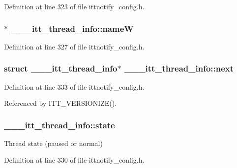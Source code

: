 Definition at line 323 of file ittnotify\-\_\-config.\-h.

\hypertarget{struct______itt__thread__info_a607067bccd38bfb17c9f7c8676caf03d}{
\subsubsection[{name\-W}]{$\ast$ \-\_\-\-\_\-\-\_\-itt\-\_\-thread\-\_\-info\-::name\-W}}\label{struct______itt__thread__info_a607067bccd38bfb17c9f7c8676caf03d}


Definition at line 327 of file ittnotify\-\_\-config.\-h.

\hypertarget{struct______itt__thread__info_a1c1665afb537536190a66931a94ccae8}{
\subsubsection[{next}]{\setlength{\rightskip}{0pt plus 5cm}struct {\bf \-\_\-\-\_\-\-\_\-itt\-\_\-thread\-\_\-info}$\ast$ \-\_\-\-\_\-\-\_\-itt\-\_\-thread\-\_\-info\-::next}}\label{struct______itt__thread__info_a1c1665afb537536190a66931a94ccae8}


Definition at line 333 of file ittnotify\-\_\-config.\-h.



Referenced by I\-T\-T\-\_\-\-V\-E\-R\-S\-I\-O\-N\-I\-Z\-E().

\hypertarget{struct______itt__thread__info_a6f6f3ed5a462461cc8dc05b650e331ba}{
\subsubsection[{state}]{ \-\_\-\-\_\-\-\_\-itt\-\_\-thread\-\_\-info\-::state}}\label{struct______itt__thread__info_a6f6f3ed5a462461cc8dc05b650e331ba}
Thread state (paused or normal) 

Definition at line 330 of file ittnotify\-\_\-config.\-h.

